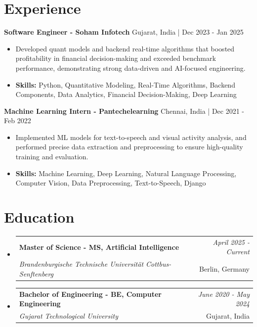 \documentclass[a4paper,11pt]{article}
\makeatletter
\newcommand{\resumeSubheading}[4]{
\vspace{0.5mm}\item
    \begin{tabular*}{\linewidth}[t]{l@{\extracolsep{\fill}}r}
        \textbf{#1} & \textit{\footnotesize{#4}} \\
        \textit{\footnotesize{#3}} &  \footnotesize{#2}\\
    \end{tabular*}
    \vspace{-2.4mm}
}
\makeatother
\begin{document}
\section{\textbf{Experience}}


\vspace{1mm}
  \textbf{Software Engineer - Soham Infotech} \hfill Gujarat, India | Dec 2023 - Jan 2025
\vspace{-1.5mm} %
\begin{itemize}
  \item Developed quant models and backend real-time algorithms that boosted profitability in financial decision-making and exceeded benchmark performance, demonstrating strong data-driven and AI-focused engineering.

\vspace{-2mm}
  \item \textbf{Skills:} Python, Quantitative Modeling, Real-Time Algorithms, Backend Components, Data Analytics, Financial Decision-Making, Deep Learning
\end{itemize}

\vspace{1mm}
  \textbf{Machine Learning Intern - Pantechelearning} \hfill Chennai, India | Dec 2021 - Feb 2022
\vspace{-1.5mm} %
\begin{itemize}
  \item Implemented ML models for text-to-speech and visual activity analysis, and performed precise data extraction and preprocessing to ensure high-quality training and evaluation.
\vspace{-2mm}
  \item \textbf{Skills:} Machine Learning, Deep Learning, Natural Language Processing, Computer Vision, Data Preprocessing, Text-to-Speech, Django
\end{itemize}\section{\textbf{Education}}
\vspace{-0.4mm}

\begin{itemize}[leftmargin=0.15in, label={}]
\resumeSubheading
{Master of Science - MS, Artificial Intelligence }{Berlin, Germany}
{Brandenburgische Technische Universität Cottbus-Senftenberg  }{April 2025 - Current}

\vspace{1.0mm} %
\resumeSubheading
{Bachelor of Engineering - BE, Computer Engineering  }{Gujarat, India}
{Gujarat Technological University }{June 2020 - May 2024}

\end{itemize}
\end{document}
